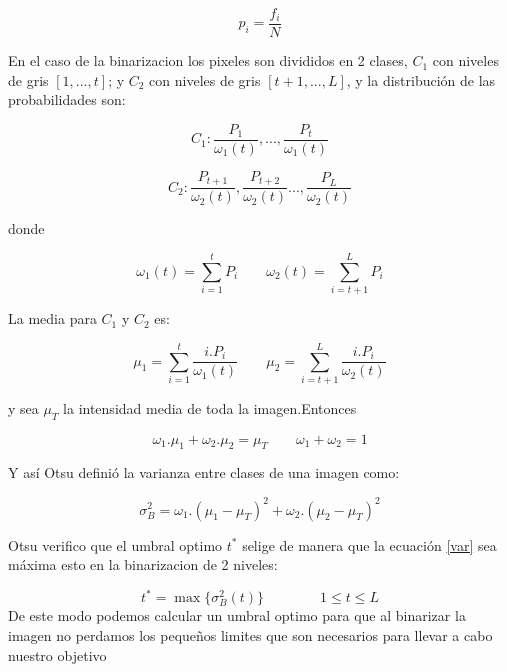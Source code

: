 \documentclass[12pt]{article}
\begin{document}
\begin{equation}\label{ec1}
p_{i} = \frac{f_{i}}{N}
\end{equation}

En el caso de la binarizacion los pixeles son divididos en 2 clases, $C_{1}$ con niveles de gris $[1, ..., t]$; y $C_{2}$ con niveles de gris $[t+1, ..., L]$, y la distribución de las probabilidades son:

\begin{equation}
C_{1} : \frac{P_{1}}{\omega_{1}(t)}, ..., \frac{P_{t}}{\omega_{1}(t)}
\end{equation}

\begin{equation}
C_{2} : \frac{P_{t+1}}{\omega_{2}(t)}, \frac{P_{t+2}}{\omega_{2}(t)} ..., \frac{P_{L}}{\omega_{2}(t)}
\end{equation}

donde

\begin{equation}
\omega_{1}(t) = \sum_{i=1}^t P_{i} \qquad \omega_{2}(t) = \sum_{i=t+1}^L P_{i}
\end{equation}

La media para $C_{1}$ y $C_{2}$ es:

\begin{equation}
\mu_{1} = \sum_{i=1}^t \frac{i.P_{i}}{\omega_{1}(t)} \qquad \mu_{2} = \sum_{i=t+1}^L \frac{i.P_{i}}{\omega_{2}(t)}
\end{equation}

y sea $\mu_{T}$ la intensidad media de toda la imagen.Entonces

\begin{equation}
\omega_{1}.\mu_{1}+\omega_2.\mu_{2}=\mu_{T} \qquad \omega_{1}+\omega_{2}=1
\end{equation}

Y así Otsu definió la varianza entre clases de una imagen como:

\begin{equation}\label{var}
\sigma_{B}^2=\omega_{1}.(\mu_{1}-\mu_{T})^2+\omega_{2}.(\mu_{2}-\mu_{T})^2
\end{equation}

Otsu verifico que el umbral optimo $t^*$ selige de manera que la ecuación  \ref{var} sea máxima esto en la binarizacion de 2 niveles:

\begin{equation}
t^*= \max{\{\sigma_{B}^2(t)\}} \qquad \qquad 1\leq t \leq L
\end{equation}
De este modo podemos calcular un umbral optimo para que al binarizar la imagen no perdamos los pequeños limites que son necesarios para llevar a cabo nuestro objetivo
\end{document}
